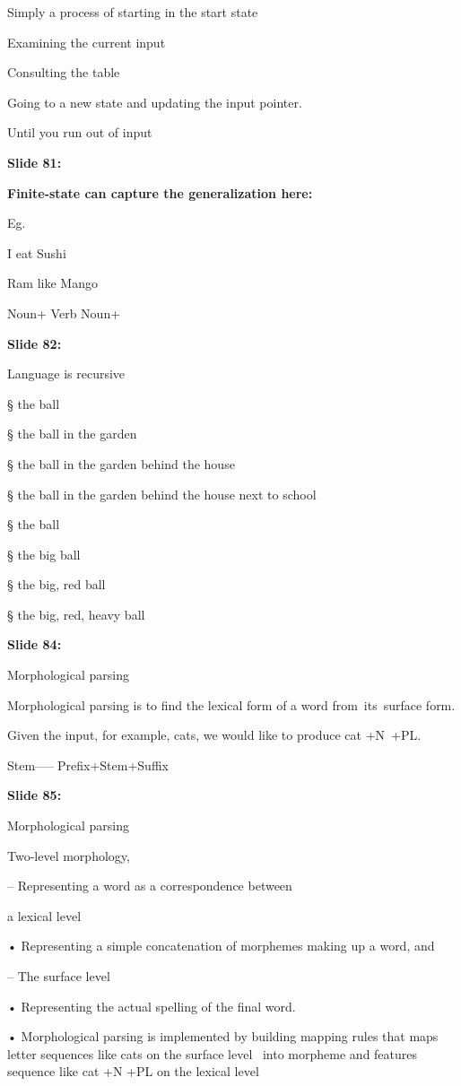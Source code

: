 \documentclass[11pt,a4paper]{article}
\begin{document}
Simply a process of starting in the start state

Examining the current input

Consulting the table

Going to a new state and updating the input pointer.

Until you run out of input

\textbf{Slide 81:}

\textbf{Finite-state can capture the generalization here:} 

Eg.

I eat Sushi

Ram like Mango

Noun+ Verb Noun+

\textbf{Slide 82:}

Language is recursive

§ the ball

§ the ball in the garden

§ the ball in the garden behind the house

§ the ball in the garden behind the house     next to school

§ the ball

§ the big ball

§ the big, red ball

§ the big, red, heavy ball

\textbf{Slide 84:}

Morphological parsing

Morphological parsing is to find the lexical form of a word from its surface form.

Given the input, for example, cats, we would like to produce cat +N +PL.

Stem-----Prefix+Stem+Suffix

\textbf{Slide 85:}

Morphological parsing

Two-level morphology,

– Representing a word as a correspondence between

a lexical level

• Representing a simple concatenation of morphemes making up a word, and

– The surface level

• Representing the actual spelling of the final word.

• Morphological parsing is implemented by building mapping rules that maps letter sequences like cats on the surface level  into morpheme and features sequence like cat +N +PL on the lexical level
\end{document}
